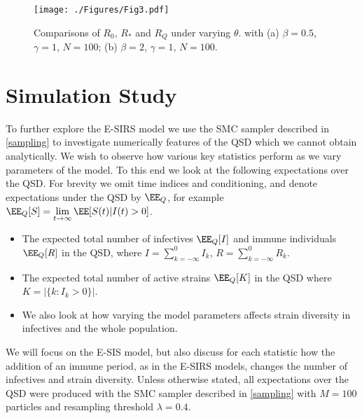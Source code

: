 \documentclass[review]{elsarticle}
\begin{document}
\begin{figure}
	\centering
 		\texttt{[image: ./Figures/Fig3.pdf]}
	\caption{Comparisons of $R_0$, $R_*$ and $R_Q$ under varying $\theta$. with (a) $\beta = 0.5$, $\gamma = 1$, $N = 100$; (b) $\beta=2$, $\gamma=1$, $N=100$.}
	\label{fig: ro comp}
\end{figure}

\section{Simulation Study}\label{sec: sim study}
To further explore the E-SIRS model we use the SMC sampler described in \ref{sampling} to investigate numerically features of the QSD which we cannot obtain analytically. We wish to observe how various key statistics perform as we vary parameters of the model. To this end we look at the following expectations over the QSD. For brevity we omit time indices and conditioning, and denote expectations under the QSD by $\EE_Q$, for example $\EE_Q[S]=\lim\limits_{t\rightarrow \infty} \EE[S(t)|I(t)>0]$.
\begin{itemize}
	\item The expected total number of infectives $\EE_Q[I]$ and immune individuals $\EE_Q[R]$ in the QSD, where $I = \sum_{k=-\infty}^0 I_k$, $R = \sum_{k=-\infty}^0 R_k$. 
	\item The expected total number of active strains $\EE_Q[K]$ in the QSD where $K = |\{k : I_k > 0\}|$. 
	\item We also look at how varying the model parameters affects strain diversity in infectives and the whole population.
\end{itemize}
We will focus on the E-SIS model, but also discuss for each statistic how the addition of an immune period, as in the E-SIRS models, changes the number of infectives and strain diversity. Unless otherwise stated, all expectations over the QSD were produced with the SMC sampler described in \ref{sampling} with $M=100$ particles and resampling threshold $\lambda=0.4$.
\end{document}
